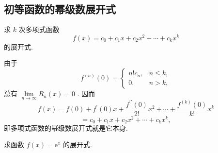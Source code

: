 \subsection{初等函数的幂级数展开式}

\begin{example}

\end{example}
求 \(k\) 次多项式函数
\[
f\left( x\right)  = {c}_{0} + {c}_{1}x + {c}_{2}{x}^{2} + \cdots  + {c}_{k}{x}^{k}
\]
的展开式.

\begin{solution}

\end{solution}
由于
\[
{f}^{\left( n\right) }\left( 0\right)  = \left\{  \begin{array}{ll} n!{c}_{n}, & n \leq  k, \\  0, & n > k, \end{array}\right.
\]
总有 \(\mathop{\lim }\limits_{{n \rightarrow  \infty }}{R}_{n}\left( x\right)  = 0\) . 因而
\[
f\left( x\right)  = f\left( 0\right)  + {f}^{\prime }\left( 0\right) x + \frac{{f}^{\prime \prime }\left( 0\right) }{2!}{x}^{2} + \cdots  + \frac{{f}^{\left( k\right) }\left( 0\right) }{k!}{x}^{k}
\]
\[
= {c}_{0} + {c}_{1}x + {c}_{2}{x}^{2} + \cdots  + {c}_{k}{x}^{k},
\]
即多项式函数的幂级数展开式就是它本身.

\begin{example}

\end{example}
求函数 \(f\left( x\right)  = {\mathrm{e}}^{x}\) 的展开式.

